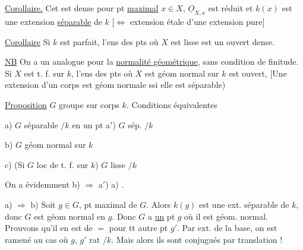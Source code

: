 
\uline{Corollaire.} Cet  est dense  pour  pt \uline{maximal} $x\in X$, $\underline O_{X,x}$ est réduit et $k(x)$ est une extension \uline{séparable} de $k$ $[\Leftrightarrow$  extension étale d'une extension  pure$]$

\uline{Corollaire} Si $k$ est parfait, l'ens des pts où $X$ est lisse est un ouvert dense.

\uline{NB} On a un  analogue pour la \uline{normalité géométrique}, sans condition de finitude. Si $X$ est   t. f. sur $k$, l'ens des pts où $X$ est géom normal sur $k$ est ouvert,  [Une extension d'un corps est géom normale ssi elle est séparable)


\uline{Proposition} $G$ groupe sur corps $k$. Conditions équivalentes


a) $G$  séparable $/k$ en un pt \qquad a$'$) $G$ sép. $/k$ 

b) $G$ géom normal sur $k$

c) (Si $G$ loc de t. f. sur $k$) $G$ lisse $/k$

On a évidemment  b) $\Rightarrow$ a$'$) \unsure{$\Rightarrow$|$\Longrightarrow$} a) .


a) $\Rightarrow$ b) \qquad Soit $g\in G$,  pt maximal de $G$.   Alors $k(g)$ est une ext. séparable de $k$, donc $G$ est géom normal en $g$.   Donc $G$ a \uline{un} pt $g$ où il est géom. normal. Prouvons qu'il en est de $=$ pour tt autre pt $g'$. Par ext. de la base, on est ramené au cas où $g$, $g'$ rat $/k$. Mais alors ils sont conjugués par translation !

